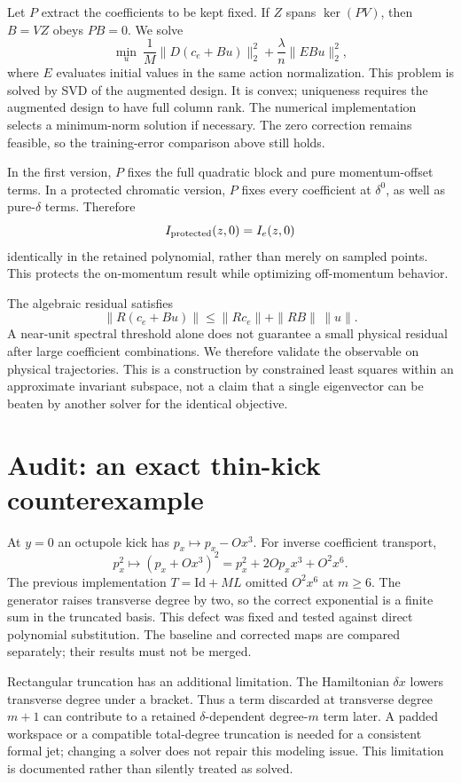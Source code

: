 \documentclass[11pt]{article}
\begin{document}
Let $P$ extract the coefficients to be kept fixed. If $Z$ spans $\ker(PV)$, then $B=VZ$ obeys $PB=0$. We solve
\[
 \min_u\ \frac1M\|D(c_e+Bu)\|_2^2
       +\frac\lambda n\|E Bu\|_2^2,
\]
where $E$ evaluates initial values in the same action normalization. This problem is solved by SVD of the augmented design. It is convex; uniqueness requires the augmented design to have full column rank. The numerical implementation selects a minimum-norm solution if necessary. The zero correction remains feasible, so the training-error comparison above still holds.

In the first version, $P$ fixes the full quadratic block and pure momentum-offset terms. In a protected chromatic version, $P$ fixes every coefficient at $\delta^0$, as well as pure-$\delta$ terms. Therefore
\[
 I_{\rm protected}(z,0)=I_e(z,0)
\]
identically in the retained polynomial, rather than merely on sampled points. This protects the on-momentum result while optimizing off-momentum behavior.

The algebraic residual satisfies
\[
 \|R(c_e+Bu)\|\leq\|Rc_e\|+\|RB\|\,\|u\|.
\]
A near-unit spectral threshold alone does not guarantee a small physical residual after large coefficient combinations. We therefore validate the observable on physical trajectories. This is a construction by constrained least squares within an approximate invariant subspace, not a claim that a single eigenvector can be beaten by another solver for the identical objective.

\section{Audit: an exact thin-kick counterexample}
At $y=0$ an octupole kick has $p_x\mapsto p_x-Ox^3$. For inverse coefficient transport,
\[
 p_x^2\mapsto(p_x+Ox^3)^2=p_x^2+2Op_xx^3+O^2x^6.
\]
The previous implementation $T=\mathrm{Id}+ML$ omitted $O^2x^6$ at $m\geq6$. The generator raises transverse degree by two, so the correct exponential is a finite sum in the truncated basis. This defect was fixed and tested against direct polynomial substitution. The baseline and corrected maps are compared separately; their results must not be merged.

Rectangular truncation has an additional limitation. The Hamiltonian $\delta x$ lowers transverse degree under a bracket. Thus a term discarded at transverse degree $m+1$ can contribute to a retained $\delta$-dependent degree-$m$ term later. A padded workspace or a compatible total-degree truncation is needed for a consistent formal jet; changing a solver does not repair this modeling issue. This limitation is documented rather than silently treated as solved.
\end{document}
